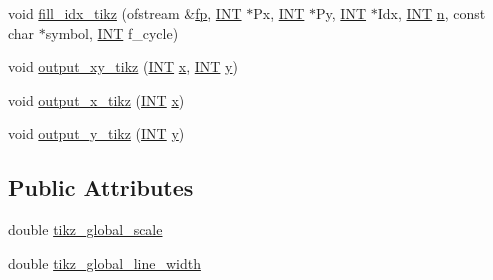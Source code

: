 \begin{DoxyCompactItemize}
\item 
void \mbox{\hyperlink{classmp__graphics_a6d871b98a58914222b7ad34af1b699ca}{fill\+\_\+idx\+\_\+tikz}} (ofstream \&\mbox{\hyperlink{k__arc__lifting_8_c_a67cc9fbd0817c2d140368e5ed1f2a44d}{fp}}, \mbox{\hyperlink{galois_8h_a09fddde158a3a20bd2dcadb609de11dc}{I\+NT}} $\ast$Px, \mbox{\hyperlink{galois_8h_a09fddde158a3a20bd2dcadb609de11dc}{I\+NT}} $\ast$Py, \mbox{\hyperlink{galois_8h_a09fddde158a3a20bd2dcadb609de11dc}{I\+NT}} $\ast$Idx, \mbox{\hyperlink{galois_8h_a09fddde158a3a20bd2dcadb609de11dc}{I\+NT}} \mbox{\hyperlink{simeon_8_c_a7f2cd26777ce0ff3fdaf8d02aacbddfb}{n}}, const char $\ast$symbol, \mbox{\hyperlink{galois_8h_a09fddde158a3a20bd2dcadb609de11dc}{I\+NT}} f\+\_\+cycle)
\item 
void \mbox{\hyperlink{classmp__graphics_a640800bc67fec9ed441b27c71461e9c6}{output\+\_\+xy\+\_\+tikz}} (\mbox{\hyperlink{galois_8h_a09fddde158a3a20bd2dcadb609de11dc}{I\+NT}} \mbox{\hyperlink{alphabet2_8_c_a6150e0515f7202e2fb518f7206ed97dc}{x}}, \mbox{\hyperlink{galois_8h_a09fddde158a3a20bd2dcadb609de11dc}{I\+NT}} \mbox{\hyperlink{alphabet2_8_c_a0a2f84ed7838f07779ae24c5a9086d33}{y}})
\item 
void \mbox{\hyperlink{classmp__graphics_a311d4fb1c32d1eb0faeee055bb8badee}{output\+\_\+x\+\_\+tikz}} (\mbox{\hyperlink{galois_8h_a09fddde158a3a20bd2dcadb609de11dc}{I\+NT}} \mbox{\hyperlink{alphabet2_8_c_a6150e0515f7202e2fb518f7206ed97dc}{x}})
\item 
void \mbox{\hyperlink{classmp__graphics_a0d6bddb89b4c58c82aa124dd003dda08}{output\+\_\+y\+\_\+tikz}} (\mbox{\hyperlink{galois_8h_a09fddde158a3a20bd2dcadb609de11dc}{I\+NT}} \mbox{\hyperlink{alphabet2_8_c_a0a2f84ed7838f07779ae24c5a9086d33}{y}})
\end{DoxyCompactItemize}
\subsection*{Public Attributes}
\begin{DoxyCompactItemize}
\item 
double \mbox{\hyperlink{classmp__graphics_a845b74cc0143773b05d4f51992eac2cd}{tikz\+\_\+global\+\_\+scale}}
\item 
double \mbox{\hyperlink{classmp__graphics_aa82a30a3b7d78b0699ad3df624f7e0f4}{tikz\+\_\+global\+\_\+line\+\_\+width}}
\end{DoxyCompactItemize}
